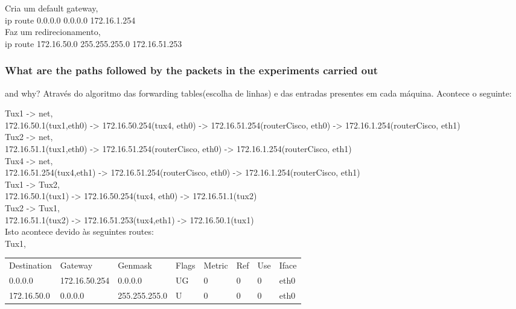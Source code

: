 \documentclass[a4paper]{article}
\begin{document}
\noindent Cria um default gateway,\\
ip route 0.0.0.0 0.0.0.0 172.16.1.254\\

\noindent Faz um redirecionamento,\\
ip route 172.16.50.0 255.255.255.0 172.16.51.253

\subsubsection{What are the paths followed by the packets in the experiments carried out}
and why?
Através do algoritmo das forwarding tables(escolha de linhas) e das entradas presentes em cada máquina. Acontece o seguinte:

\noindent Tux1 -> net,\\
172.16.50.1(tux1,eth0) -> 172.16.50.254(tux4, eth0) -> 172.16.51.254(routerCisco, eth0) -> 172.16.1.254(routerCisco, eth1)\\

\noindent Tux2 -> net,\\
172.16.51.1(tux1,eth0) -> 172.16.51.254(routerCisco, eth0) -> 172.16.1.254(routerCisco, eth1)\\

\noindent Tux4 -> net,\\
172.16.51.254(tux4,eth1) -> 172.16.51.254(routerCisco, eth0) -> 172.16.1.254(routerCisco, eth1)\\

\noindent Tux1 -> Tux2,\\
172.16.50.1(tux1) -> 172.16.50.254(tux4, eth0) -> 172.16.51.1(tux2)\\

\noindent Tux2 -> Tux1,\\
172.16.51.1(tux2) -> 172.16.51.253(tux4,eth1) -> 172.16.50.1(tux1)\\

\noindent Isto acontece devido às seguintes routes:\\

\noindent Tux1,\\
\begin{tabular}{l l l l l l l l}
Destination & Gateway & Genmask & Flags & Metric & Ref & Use & Iface \\
0.0.0.0 & 172.16.50.254 & 0.0.0.0 & UG & 0 & 0 & 0 & eth0 \\
172.16.50.0 & 0.0.0.0 & 255.255.255.0 & U & 0 & 0 & 0 & eth0
\end{tabular}\\
\end{document}
